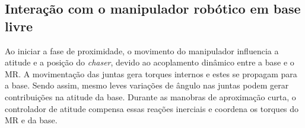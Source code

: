 \subsection{Interação com o manipulador robótico em base livre}

Ao iniciar a fase de proximidade, o movimento do manipulador influencia a atitude e a posição do \emph{chaser}, devido ao acoplamento dinâmico entre a base e o MR.  
A movimentação das juntas gera torques internos e estes se propagam para a base.  
Sendo assim, mesmo leves variações de ângulo nas juntas podem gerar contribuições na atitude da base.
Durante as manobras de aproximação curta, o controlador de atitude compensa essas reações inerciais e coordena os torques do MR e da base.  